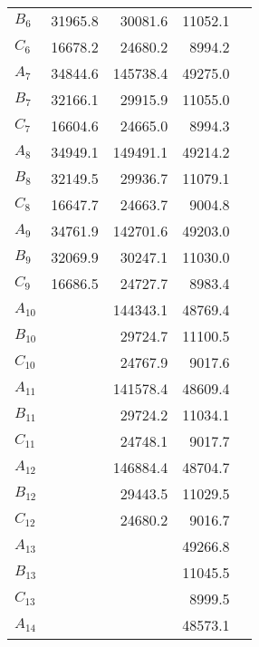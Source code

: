\begin{table}
\begin{tabular}{lrrrr}
$B_{6    }$ &         31965.8 &         30081.6 &         11052.1 \\
$C_{6    }$ &         16678.2 &         24680.2 &          8994.2 \\
$A_{7    }$ &         34844.6 &        145738.4 &         49275.0 \\
$B_{7    }$ &         32166.1 &         29915.9 &         11055.0 \\
$C_{7    }$ &         16604.6 &         24665.0 &          8994.3 \\
$A_{8    }$ &         34949.1 &        149491.1 &         49214.2 \\
$B_{8    }$ &         32149.5 &         29936.7 &         11079.1 \\
$C_{8    }$ &         16647.7 &         24663.7 &          9004.8 \\
$A_{9    }$ &         34761.9 &        142701.6 &         49203.0 \\
$B_{9    }$ &         32069.9 &         30247.1 &         11030.0 \\
$C_{9    }$ &         16686.5 &         24727.7 &          8983.4 \\
$A_{10   }$ &                 &        144343.1 &         48769.4 \\
$B_{10   }$ &                 &         29724.7 &         11100.5 \\
$C_{10   }$ &                 &         24767.9 &          9017.6 \\
$A_{11   }$ &                 &        141578.4 &         48609.4 \\
$B_{11   }$ &                 &         29724.2 &         11034.1 \\
$C_{11   }$ &                 &         24748.1 &          9017.7 \\
$A_{12   }$ &                 &        146884.4 &         48704.7 \\
$B_{12   }$ &                 &         29443.5 &         11029.5 \\
$C_{12   }$ &                 &         24680.2 &          9016.7 \\
$A_{13   }$ &                 &                 &         49266.8 \\
$B_{13   }$ &                 &                 &         11045.5 \\
$C_{13   }$ &                 &                 &          8999.5 \\
$A_{14   }$ &                 &                 &         48573.1 \\

\end{tabular}
\end{table}
